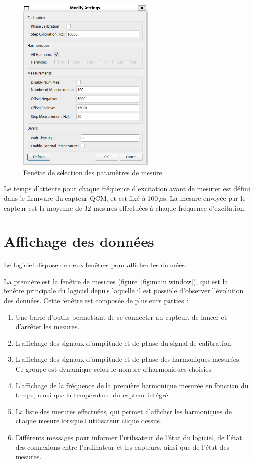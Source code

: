 \begin{figure}[H]
    \centering
    \includegraphics[width=0.6\textwidth]{assets/figures/DefaultSettings.png}
    \caption{Fenêtre de sélection des paramètres de mesure}
    \label{fig:paramerter window}
\end{figure}

Le temps d'attente pour chaque fréquence d'excitation avant de mesurer est défini dans le firmware du capteur QCM, et est fixé à 100 $\mu $s.
La mesure envoyée par le capteur est la moyenne de 32 mesures effectuées à chaque fréquence d'excitation.
\newpage
\section{Affichage des données} 

Le logiciel dispose de deux fenêtres pour afficher les données.

La première est la fenêtre de mesures (figure~\ref{fig:main window}), qui est la fenêtre principale du logiciel depuis laquelle il est possible d'observer l'évolution des données.  
Cette fenêtre est composée de plusieurs parties :

\begin{enumerate}
    \item Une barre d'outils permettant de se connecter au capteur, de lancer et d'arrêter les mesures.
    \item L'affichage des signaux d'amplitude et de phase du signal de calibration.
    \item L'affichage des signaux d'amplitude et de phase des harmoniques mesurées. Ce groupe est dynamique selon le nombre d'harmoniques choisies.
    \item L'affichage de la fréquence de la première harmonique mesurée en fonction du temps, ainsi que la température du capteur intégré.
    \item La liste des mesures effectuées, qui permet d'afficher les harmoniques de chaque mesure lorsque l'utilisateur clique dessus.
    \item Différents messages pour informer l'utilisateur de l'état du logiciel, de l'état des connexions entre l'ordinateur et les capteurs, ainsi que de l'état des mesures.
\end{enumerate}

